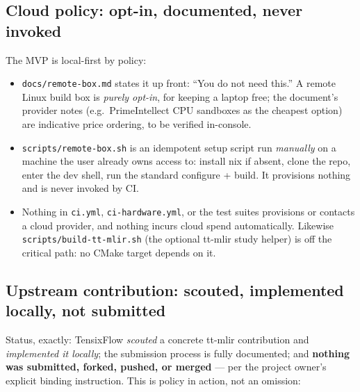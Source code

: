 \subsection{Cloud policy: opt-in, documented, never invoked}

The MVP is local-first by policy:
\begin{itemize}[nosep]
  \item \texttt{docs/remote-box.md} states it up front: ``You do not need
        this.'' A remote Linux build box is \emph{purely opt-in}, for keeping
        a laptop free; the document's provider notes (e.g.\ PrimeIntellect
        CPU sandboxes as the cheapest option) are indicative price ordering,
        to be verified in-console.
  \item \texttt{scripts/remote-box.sh} is an idempotent setup script run
        \emph{manually} on a machine the user already owns access to:
        install nix if absent, clone the repo, enter the dev shell, run the
        standard configure + build. It provisions nothing and is never
        invoked by CI.
  \item Nothing in \texttt{ci.yml}, \texttt{ci-hardware.yml}, or the test
        suites provisions or contacts a cloud provider, and nothing incurs
        cloud spend automatically. Likewise \texttt{scripts/build-tt-mlir.sh}
        (the optional tt-mlir study helper) is off the critical path: no
        CMake target depends on it.
\end{itemize}

\subsection{Upstream contribution: scouted, implemented locally, not submitted}

Status, exactly: TensixFlow \emph{scouted} a concrete tt-mlir contribution
and \emph{implemented it locally}; the submission process is fully
documented; and \textbf{nothing was submitted, forked, pushed, or merged}
--- per the project owner's explicit binding instruction. This is policy in
action, not an omission:

